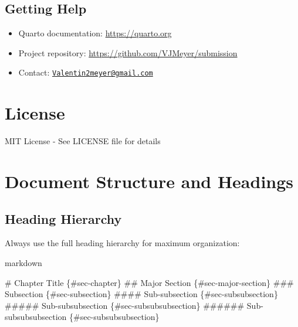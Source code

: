 \documentclass[
  11pt,
  letterpaper,
]{book}
\newenvironment{Shaded}{\begin{snugshade}}{\end{snugshade}}
\newcommand{\FunctionTok}[1]{\textcolor[rgb]{0.28,0.35,0.67}{#1}}
\newcommand{\InformationTok}[1]{\textcolor[rgb]{0.37,0.37,0.37}{#1}}
\providecommand{\tightlist}{%
  \setlength{\itemsep}{0pt}\setlength{\parskip}{0pt}}
\begin{document}
\subsection*{Getting Help}\label{getting-help}

\begin{itemize}
\tightlist
\item
  Quarto documentation: \url{https://quarto.org}
\item
  Project repository: \url{https://github.com/VJMeyer/submission}
\item
  Contact:
  \href{mailto:Valentin2meyer@gmail.com}{\nolinkurl{Valentin2meyer@gmail.com}}
\end{itemize}

\section*{License}\label{license}


MIT License - See LICENSE file for details

\section*{Document Structure and
Headings}\label{document-structure-and-headings}


\subsection*{Heading Hierarchy}\label{heading-hierarchy}

Always use the full heading hierarchy for maximum organization:

markdown

\begin{Shaded}
\begin{Highlighting}[]
\FunctionTok{\# Chapter Title \{\#sec{-}chapter\}}
\FunctionTok{\#\# Major Section \{\#sec{-}major{-}section\}}
\FunctionTok{\#\#\# Subsection \{\#sec{-}subsection\}}
\FunctionTok{\#\#\#\# Sub{-}subsection \{\#sec{-}subsubsection\}}
\InformationTok{\textasciigrave{}\#\#\#\#\# Sub{-}subsubsection \{\#sec{-}subsubsubsection\}\textasciigrave{}}
\InformationTok{\textasciigrave{}\#\#\#\#\#\# Sub{-}subsubsubsection \{\#sec{-}subsubsubsection\}\textasciigrave{}}
\end{Highlighting}
\end{Shaded}
\end{document}
